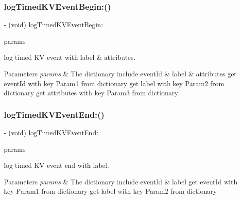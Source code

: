\subsubsection{\texorpdfstring{log\+Timed\+K\+V\+Event\+Begin\+:()}{logTimedKVEventBegin:()}}
{\footnotesize\ttfamily -\/ (void) log\+Timed\+K\+V\+Event\+Begin\+: \begin{DoxyParamCaption}\item[{(N\+S\+Mutable\+Dictionary$\ast$)}]{params }\end{DoxyParamCaption}}



log timed KV event with label \& attributes. 


\begin{DoxyParams}{Parameters}
{\em params} & The dictionary include event\+Id \& label \& attributes get event\+Id with key \textquotesingle{}Param1\textquotesingle{} from dictionary get label with key \textquotesingle{}Param2\textquotesingle{} from dictionary get attributes with key \textquotesingle{}Param3\textquotesingle{} from dictionary \\
\hline
\end{DoxyParams}
\mbox{\label{interfaceAnalyticsUmeng_ab9986d459e9d420450f291749e14d06f}} 
\subsubsection{\texorpdfstring{log\+Timed\+K\+V\+Event\+End\+:()}{logTimedKVEventEnd:()}}
{\footnotesize\ttfamily -\/ (void) log\+Timed\+K\+V\+Event\+End\+: \begin{DoxyParamCaption}\item[{(N\+S\+Mutable\+Dictionary$\ast$)}]{params }\end{DoxyParamCaption}}



log timed KV event end with label. 


\begin{DoxyParams}{Parameters}
{\em params} & The dictionary include event\+Id \& label get event\+Id with key \textquotesingle{}Param1\textquotesingle{} from dictionary get label with key \textquotesingle{}Param2\textquotesingle{} from dictionary \\
\hline
\end{DoxyParams}
\mbox{\label{interfaceAnalyticsUmeng_ab7da204f27cd3c7879daa9f25af7de64}} 
